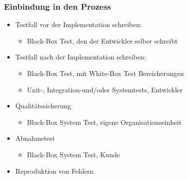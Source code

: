 \documentclass[../ZF_SWEN1.tex]{subfiles}
\begin{document}
\subsubsection{Einbindung in den Prozess}
\begin{itemize}
	\item Testfall vor der Implementation schreiben:
	\begin{itemize}
		\item Black-Box Test, den der Entwickler selber schreibt
	\end{itemize}

	\item Testfall nach der Implementation schreiben:
		\begin{itemize}
		\item Black-Box Test, mit White-Box Test Bereicherungen
		\item Unit-, Integration-und/oder Systemtests, Entwickler
	\end{itemize}
	\item Qualitätssicherung
	\begin{itemize}
		\item Black-Box System Test, eigene Organisationseinheit
	\end{itemize}
	\item Abnahmetest
	\begin{itemize}
		\item Black-Box System Test, Kunde
	\end{itemize}
	\item Reproduktion von Fehlern
\end{itemize}
\end{document}
